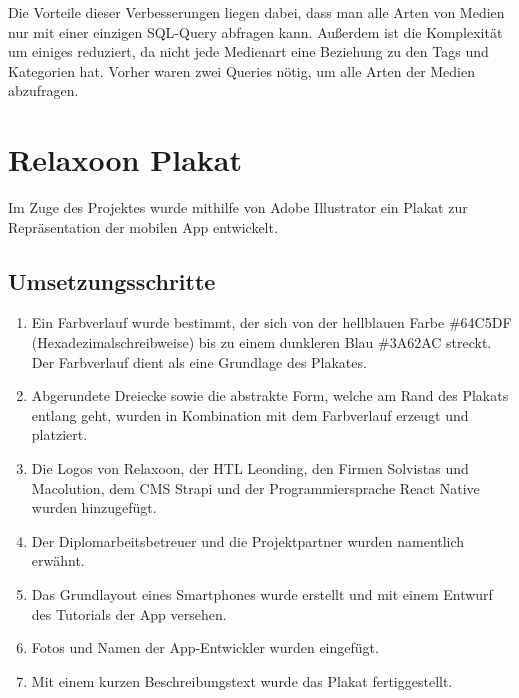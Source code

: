 Die Vorteile dieser Verbesserungen liegen dabei, dass man alle Arten von Medien nur mit einer einzigen SQL-Query abfragen kann. Außerdem ist die Komplexität um einiges reduziert, da nicht jede Medienart eine Beziehung zu den Tags und Kategorien hat.
Vorher waren zwei Queries nötig, um alle Arten der Medien abzufragen.

\section{Relaxoon Plakat}\label{sec:plakat}

Im Zuge des Projektes wurde mithilfe von Adobe Illustrator ein Plakat zur Repräsentation der mobilen App
entwickelt.

\subsection{Umsetzungsschritte}

\begin{enumerate}
    \item Ein Farbverlauf wurde bestimmt, der sich von der hellblauen Farbe \#64C5DF (Hexadezimalschreibweise)
          bis zu einem dunkleren Blau \#3A62AC streckt. Der Farbverlauf dient als eine Grundlage des Plakates.
    \item Abgerundete Dreiecke sowie die abstrakte Form, welche am Rand des Plakats entlang geht,
          wurden in Kombination mit dem Farbverlauf erzeugt und platziert.
    \item Die Logos von Relaxoon, der HTL Leonding, den Firmen Solvistas und Macolution, dem CMS Strapi und der Programmiersprache React Native wurden hinzugefügt.
    \item Der Diplomarbeitsbetreuer und die Projektpartner wurden namentlich erwähnt.
    \item Das Grundlayout eines Smartphones wurde erstellt und mit einem Entwurf des Tutorials der App versehen.
    \item Fotos und Namen der App-Entwickler wurden eingefügt.
    \item Mit einem kurzen Beschreibungstext wurde das Plakat fertiggestellt.
\end{enumerate}


